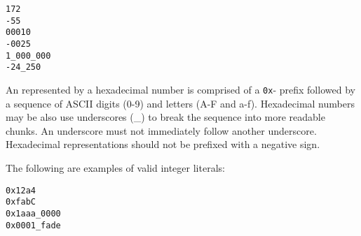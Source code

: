 \begin{lstlisting}[language=grid]
172
-55
00010
-0025
1_000_000
-24_250
\end{lstlisting}

An  represented by a hexadecimal number is 
comprised of a \lstinline[language=grid]!0x!- prefix followed by a sequence of 
ASCII digits (0-9) and letters (A-F and a-f).  Hexadecimal numbers may be also 
use underscores (\_) to break the sequence into more readable chunks. An 
underscore must not immediately follow another underscore. Hexadecimal 
representations should not be prefixed with a negative sign.

The following are examples of valid integer literals:

\begin{lstlisting}[language=grid]
0x12a4
0xfabC
0x1aaa_0000
0x0001_fade
\end{lstlisting}
